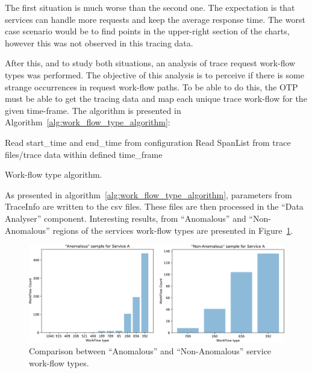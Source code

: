 The first situation is much worse than the second one. The expectation is that services can handle more requests and keep the average response time. The worst case scenario would be to find points in the upper-right section of the charts, however this was not observed in this tracing data.

After this, and to study both situations, an analysis of trace request work-flow types was performed. The objective of this analysis is to perceive if there is some strange occurrences in request work-flow paths. To be able to do this, the OTP must be able to get the tracing data and map each unique trace work-flow for the given time-frame. The algorithm is presented in Algorithm~\ref{alg:work_flow_type_algorithm}:

\begin{algorithm}
  Read start\_time and end\_time from configuration\;
  Read SpanList from trace files/trace data within defined time\_frame\;
  \caption{Work-flow type algorithm.}
  \label{alg:work_flow_type_algorithm_2}
\end{algorithm}

As presented in algorithm~\ref{alg:work_flow_type_algorithm}, parameters from TraceInfo are written to the \gls{csv} files. These files are then processed in the ``Data Analyser'' component. Interesting results, from ``Anomalous'' and ``Non-Anomalous'' regions of the services work-flow types are presented in Figure~\ref{fig:work_flow_type_analysis}.

\begin{figure}
  \centerline{\includegraphics[width=1.0\linewidth]{images/workflow_type_count.pdf}}
  \caption{Comparison between ``Anomalous'' and ``Non-Anomalous'' service work-flow types.}
  \label{fig:work_flow_type_analysis}
\end{figure}

